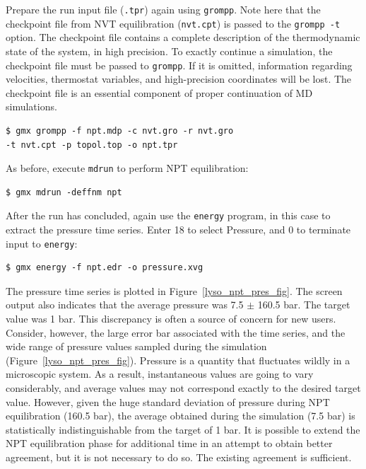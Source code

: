 \documentclass[9pt,tutorial]{livecoms}
\begin{document}
Prepare the run input file (\texttt{.tpr}) again using \texttt{grompp}. Note here that the checkpoint file from NVT equilibration (\texttt{nvt.cpt}) is passed to the \texttt{grompp -t} option. The checkpoint file contains a complete description of the thermodynamic state of the system, in high precision. To exactly continue a simulation, the checkpoint file must be passed to \texttt{grompp}. If it is omitted, information regarding velocities, thermostat variables, and high-precision coordinates will be lost. The checkpoint file is an essential component of proper continuation of MD simulations.

\begin{verbatim}
$ gmx grompp -f npt.mdp -c nvt.gro -r nvt.gro 
-t nvt.cpt -p topol.top -o npt.tpr
\end{verbatim}

As before, execute \texttt{mdrun} to perform NPT equilibration:

\begin{verbatim}
$ gmx mdrun -deffnm npt
\end{verbatim}

After the run has concluded, again use the \texttt{energy} program, in this case to extract the pressure time series. Enter 18 to select Pressure, and 0 to terminate input to \texttt{energy}:

\begin{verbatim}
$ gmx energy -f npt.edr -o pressure.xvg
\end{verbatim}

The pressure time series is plotted in Figure~\ref{lyso_npt_pres_fig}. The screen output also indicates that the average pressure was 7.5 $\pm$ 160.5 bar. The target value was 1 bar. This discrepancy is often a source of concern for new users. Consider, however, the large error bar associated with the time series, and the wide range of pressure values sampled during the simulation (Figure~\ref{lyso_npt_pres_fig}). Pressure is a quantity that fluctuates wildly in a microscopic system. As a result, instantaneous values are going to vary considerably, and average values may not correspond exactly to the desired target value. However, given the huge standard deviation of pressure during NPT equilibration (160.5 bar), the average obtained during the simulation (7.5 bar) is statistically indistinguishable from the target of 1 bar. It is possible to extend the NPT equilibration phase for additional time in an attempt to obtain better agreement, but it is not necessary to do so. The existing agreement is sufficient.
\end{document}
